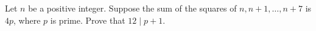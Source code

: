 Let $n$ be a positive integer. Suppose the sum of the squares of $n,n+1,\ldots,n+7$ is $4p$, where $p$ is prime. Prove that $12\mid p+1$.
